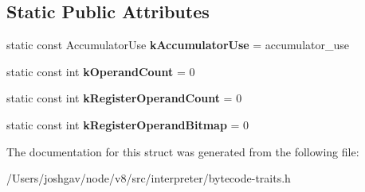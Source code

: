 \subsection*{Static Public Attributes}
\begin{DoxyCompactItemize}
\item 
static const Accumulator\+Use {\bfseries k\+Accumulator\+Use} = accumulator\+\_\+use\hypertarget{structv8_1_1internal_1_1interpreter_1_1_bytecode_traits_3_01accumulator__use_01_4_a15975c35bcb7bfab7d9ebb5b0f4d30a5}{}\label{structv8_1_1internal_1_1interpreter_1_1_bytecode_traits_3_01accumulator__use_01_4_a15975c35bcb7bfab7d9ebb5b0f4d30a5}

\item 
static const int {\bfseries k\+Operand\+Count} = 0\hypertarget{structv8_1_1internal_1_1interpreter_1_1_bytecode_traits_3_01accumulator__use_01_4_ac8d74ac459c9a9b205b87cb003914a92}{}\label{structv8_1_1internal_1_1interpreter_1_1_bytecode_traits_3_01accumulator__use_01_4_ac8d74ac459c9a9b205b87cb003914a92}

\item 
static const int {\bfseries k\+Register\+Operand\+Count} = 0\hypertarget{structv8_1_1internal_1_1interpreter_1_1_bytecode_traits_3_01accumulator__use_01_4_a2b37387ba38db82aa330a9dd5fc2e5ac}{}\label{structv8_1_1internal_1_1interpreter_1_1_bytecode_traits_3_01accumulator__use_01_4_a2b37387ba38db82aa330a9dd5fc2e5ac}

\item 
static const int {\bfseries k\+Register\+Operand\+Bitmap} = 0\hypertarget{structv8_1_1internal_1_1interpreter_1_1_bytecode_traits_3_01accumulator__use_01_4_a4abfa1a11f50e8d0f5caf3833c744c6a}{}\label{structv8_1_1internal_1_1interpreter_1_1_bytecode_traits_3_01accumulator__use_01_4_a4abfa1a11f50e8d0f5caf3833c744c6a}

\end{DoxyCompactItemize}


The documentation for this struct was generated from the following file\+:\begin{DoxyCompactItemize}
\item 
/\+Users/joshgav/node/v8/src/interpreter/bytecode-\/traits.\+h\end{DoxyCompactItemize}
